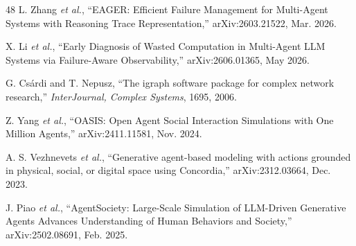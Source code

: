 \begin{thebibliography}{48}
 L. Zhang \textit{et al.}, ``EAGER: Efficient Failure Management for Multi-Agent Systems
with Reasoning Trace Representation,'' arXiv:2603.21522, Mar. 2026.

 X. Li \textit{et al.}, ``Early Diagnosis of Wasted Computation in Multi-Agent LLM Systems
via Failure-Aware Observability,'' arXiv:2606.01365, May 2026.

 G. Cs\'{a}rdi and T. Nepusz, ``The igraph software package for complex network
research,'' \textit{InterJournal, Complex Systems}, 1695, 2006.

 Z. Yang \textit{et al.}, ``OASIS: Open Agent Social Interaction Simulations with One
Million Agents,'' arXiv:2411.11581, Nov. 2024.

 A. S. Vezhnevets \textit{et al.}, ``Generative agent-based modeling with actions
grounded in physical, social, or digital space using Concordia,'' arXiv:2312.03664, Dec. 2023.

 J. Piao \textit{et al.}, ``AgentSociety: Large-Scale Simulation of LLM-Driven
Generative Agents Advances Understanding of Human Behaviors and Society,'' arXiv:2502.08691, Feb. 2025.

\end{thebibliography}
